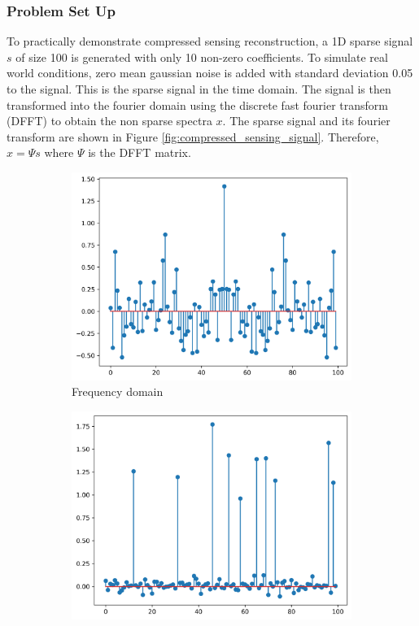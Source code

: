 \documentclass[11pt]{article}
\begin{document}
\subsubsection{Problem Set Up}
To practically demonstrate compressed sensing reconstruction, a 1D sparse signal \( s \) of size 100 is generated with only 10 non-zero coefficients. To simulate real world conditions, zero mean gaussian noise is added with standard deviation 0.05 to the signal. This is the sparse signal in the time domain. The signal is then transformed into the fourier domain using the discrete fast fourier transform (DFFT) to obtain the non sparse spectra \( x \). The sparse signal and its fourier transform are shown in Figure \ref{fig:compressed_sensing_signal}. Therefore, \( x = \Psi s \) where \( \Psi \) is the DFFT matrix. 
\begin{figure} [H]
    \centering
    \begin{subfigure}{.45\textwidth}
        \centering
        \includegraphics[width=\linewidth]{figs/q2b_original_sparse_signal_fft.png}
        \caption{Frequency domain}
        \label{fig:sparse_signal_fourier}
    \end{subfigure}%
    \begin{subfigure}{.45\textwidth}
        \centering
        \includegraphics[width=\linewidth]{figs/q2b_original_sparse_signal.png}

\end{subfigure}
\end{figure}
\end{document}
